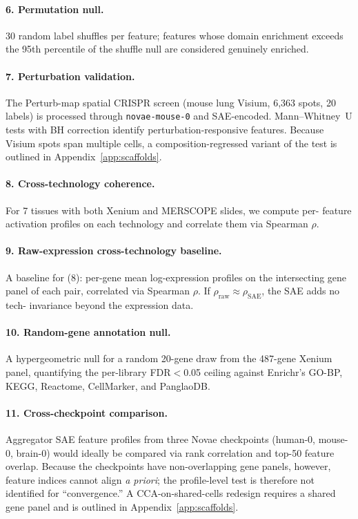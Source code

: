 \documentclass[11pt]{article}
\begin{document}
\paragraph{6. Permutation null.}
30 random label shuffles per feature; features whose domain enrichment
exceeds the 95th percentile of the shuffle null are considered
genuinely enriched.

\paragraph{7. Perturbation validation.}
The Perturb-map \citep{perturbmap} spatial CRISPR screen (mouse lung
Visium, 6{,}363 spots, 20 labels) is processed through
\texttt{novae-mouse-0} and SAE-encoded. Mann--Whitney~U tests with
BH correction identify perturbation-responsive features. Because
Visium spots span multiple cells, a composition-regressed variant of
the test is outlined in Appendix~\ref{app:scaffolds}.

\paragraph{8. Cross-technology coherence.}
For 7 tissues with both Xenium and MERSCOPE slides, we compute per-
feature activation profiles on each technology and correlate them via
Spearman $\rho$.

\paragraph{9. Raw-expression cross-technology baseline.}
A baseline for (8): per-gene mean log-expression profiles on the
intersecting gene panel of each pair, correlated via Spearman $\rho$.
If $\rho_\text{raw} \approx \rho_\text{SAE}$, the SAE adds no tech-
invariance beyond the expression data.

\paragraph{10. Random-gene annotation null.}
A hypergeometric null for a random 20-gene draw from the 487-gene
Xenium panel, quantifying the per-library FDR$<$0.05 ceiling against
Enrichr's GO-BP, KEGG, Reactome, CellMarker, and PanglaoDB.

\paragraph{11. Cross-checkpoint comparison.}
Aggregator SAE feature profiles from three Novae checkpoints
(human-0, mouse-0, brain-0) would ideally be compared via rank
correlation and top-50 feature overlap. Because the checkpoints have
non-overlapping gene panels, however, feature indices cannot align
\emph{a priori}; the profile-level test is therefore not identified
for ``convergence.'' A CCA-on-shared-cells redesign requires a shared
gene panel and is outlined in Appendix~\ref{app:scaffolds}.
\end{document}

